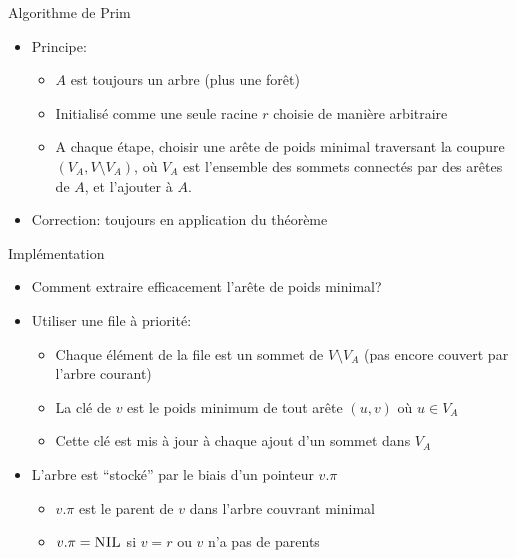 \begin{frame}{Algorithme de Prim}

\begin{itemize}
\item Principe:
\begin{itemize}
\item $A$ est toujours un arbre (plus une forêt)
\item Initialisé comme une seule racine $r$ choisie de manière arbitraire
\item A chaque étape, choisir une arête de poids minimal traversant la
  coupure $(V_A,V\setminus V_A)$, où $V_A$ est l'ensemble des sommets
  connectés par des arêtes de $A$, et l'ajouter à $A$.
\end{itemize}

\bigskip

\begin{center}
{\small
{}
}
\end{center}

\bigskip

\item Correction: toujours en application du théorème
\end{itemize}

\end{frame}

\begin{frame}{Implémentation}

\begin{itemize}
\item Comment extraire efficacement l'arête de poids minimal?
\item Utiliser une file à priorité:
\begin{itemize}
\item Chaque élément de la file est un sommet de $V\setminus V_A$ (pas
  encore couvert par l'arbre courant)
\item La clé de $v$ est le poids minimum de tout arête $(u,v)$ où $u\in V_A$
\item Cette clé est mis à jour à chaque ajout d'un sommet dans $V_A$
\end{itemize}

\bigskip

\item L'arbre est ``stocké'' par le biais d'un pointeur $v.\pi$
\begin{itemize}
\item $v.\pi$ est le parent de $v$ dans l'arbre couvrant minimal
\item $v.\pi=\textnormal{\scshape NIL}$ si $v=r$ ou $v$ n'a pas de parents
\end{itemize}
\end{itemize}

\end{frame}

